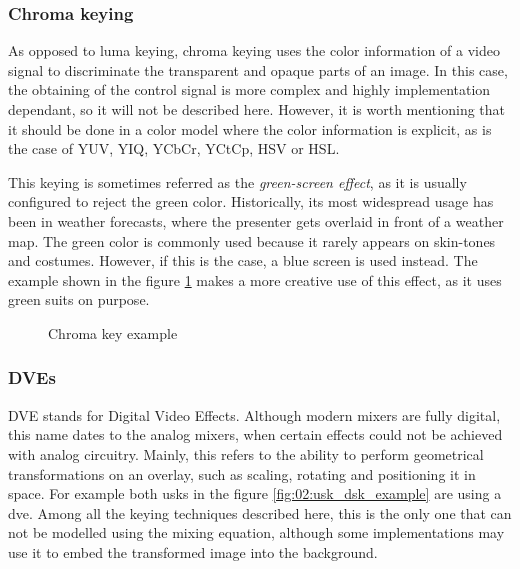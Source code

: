 \documentclass[../main.tex]{subfiles}
\begin{document}
\subsubsection{Chroma keying}
As opposed to luma keying, chroma keying uses the color information of a video signal to discriminate the transparent and opaque parts of an image. In this case, the obtaining of the control signal is more complex and highly implementation dependant, so it will not be described here. However, it is worth mentioning that it should be done in a color model where the color information is explicit, as is the case of YUV, YIQ, YCbCr, YCtCp, HSV or HSL.\newline

This keying is sometimes referred as the \textit{green-screen effect}, as it is usually configured to reject the green color\cite{OrtizRodriguez2018}. Historically, its most widespread usage has been in weather forecasts, where the presenter gets overlaid in front of a weather map. The green color is commonly used because it rarely appears on skin-tones and costumes. However, if this is the case, a blue screen is used instead. The example shown in the figure \ref{fig:02:chroma_key_example} makes a more creative use of this effect, as it uses green suits on purpose.\newline

\begin{figure}[htbp]
    \centering

    \caption{Chroma key example}
    \label{fig:02:chroma_key_example}
\end{figure}

\subsubsection{DVEs}
DVE stands for Digital Video Effects. Although modern mixers are fully digital, this name dates to the analog mixers, when certain effects could not be achieved with analog circuitry. Mainly, this refers to the ability to perform geometrical transformations on an overlay, such as scaling, rotating and positioning it in space. For example both \glspl{usk} in the figure \ref{fig:02:usk_dsk_example} are using a \gls{dve}. Among all the keying techniques described here, this is the only one that can not be modelled using the mixing equation, although some implementations may use it to embed the transformed image into the background\cite{OrtizRodriguez2018}.\newline
\end{document}
